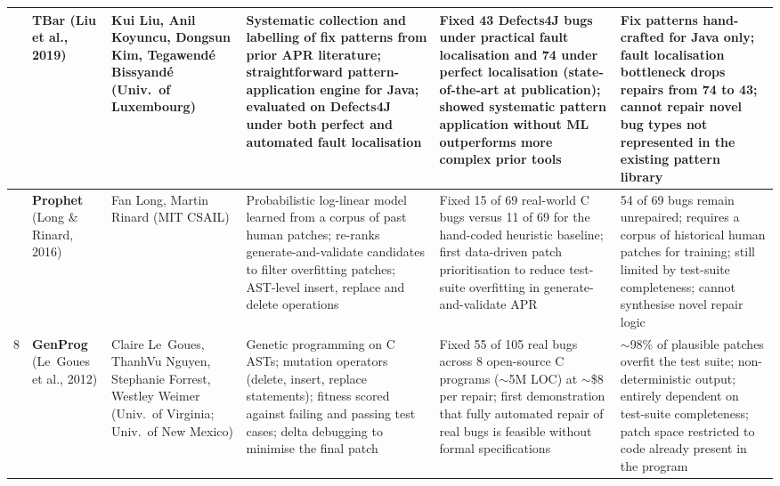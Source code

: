 {\begin{longtable}{|>{\centering\arraybackslash}p{0.6cm}|>{\raggedright\arraybackslash}p{1.9cm}|p{2.5cm}|p{3.0cm}|p{3.0cm}|p{3.0cm}|}
6 &
\textbf{TBar} \newline \cite{b10} \newline (Liu et al., 2019) &
Kui Liu, Anil Koyuncu, Dongsun Kim, Tegawend\'{e} Bissyand\'{e} \newline (Univ.\ of Luxembourg) &
Systematic collection and labelling of fix patterns from prior APR literature; straightforward pattern-application engine for Java; evaluated on Defects4J under both perfect and automated fault localisation &
Fixed 43 Defects4J bugs under practical fault localisation and 74 under perfect localisation (state-of-the-art at publication); showed systematic pattern application without ML outperforms more complex prior tools &
Fix patterns hand-crafted for Java only; fault localisation bottleneck drops repairs from 74 to 43; cannot repair novel bug types not represented in the existing pattern library \\
\hline

7 &
\textbf{Prophet} \newline \cite{b11} \newline (Long \& Rinard, 2016) &
Fan Long, Martin Rinard \newline (MIT CSAIL) &
Probabilistic log-linear model learned from a corpus of past human patches; re-ranks generate-and-validate candidates to filter overfitting patches; AST-level insert, replace and delete operations &
Fixed 15 of 69 real-world C bugs versus 11 of 69 for the hand-coded heuristic baseline; first data-driven patch prioritisation to reduce test-suite overfitting in generate-and-validate APR &
54 of 69 bugs remain unrepaired; requires a corpus of historical human patches for training; still limited by test-suite completeness; cannot synthesise novel repair logic \\
\hline

8 &
\textbf{GenProg} \newline \cite{b8} \newline (Le~Goues et al., 2012) &
Claire Le~Goues, ThanhVu Nguyen, Stephanie Forrest, Westley Weimer \newline (Univ.\ of Virginia; Univ.\ of New Mexico) &
Genetic programming on C ASTs; mutation operators (delete, insert, replace statements); fitness scored against failing and passing test cases; delta debugging to minimise the final patch &
Fixed 55 of 105 real bugs across 8 open-source C programs ($\sim$5M LOC) at $\sim$\$8 per repair; first demonstration that fully automated repair of real bugs is feasible without formal specifications &
$\sim$98\% of plausible patches overfit the test suite; non-deterministic output; entirely dependent on test-suite completeness; patch space restricted to code already present in the program \\
\hline


\end{longtable}}
